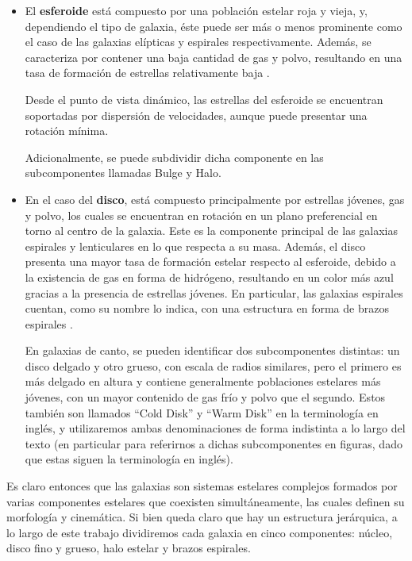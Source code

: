\begin{itemize}
    \item El \textbf{esferoide} está compuesto por una población estelar roja y vieja, y, dependiendo el tipo de galaxia, éste puede ser más o menos prominente como el caso de las galaxias elípticas y espirales respectivamente. Además, se caracteriza por contener una baja cantidad de gas y polvo, resultando en una tasa de formación de estrellas relativamente baja \citep{mo2010galaxy}.

    Desde el punto de vista dinámico, las estrellas del esferoide se encuentran soportadas por dispersión de velocidades, aunque puede presentar una rotación mínima.

    Adicionalmente, se puede subdividir dicha componente en las subcomponentes llamadas Bulge y Halo.

    \item En el caso del \textbf{disco}, está compuesto principalmente por estrellas jóvenes, gas y polvo, los cuales se encuentran en rotación en un plano preferencial en torno al centro de la galaxia. Este es la componente principal de las galaxias espirales y lenticulares en lo que respecta a su masa. Además, el disco presenta una mayor tasa de formación estelar respecto al esferoide, debido a la existencia de gas en forma de hidrógeno, resultando en un color más azul gracias a la presencia de estrellas jóvenes. En particular, las galaxias espirales cuentan, como su nombre lo indica, con una estructura en forma de brazos espirales \citep{mo2010galaxy}.

    En galaxias de canto, se pueden identificar dos subcomponentes distintas: un disco delgado y otro grueso, con escala de radios similares, pero el primero es más delgado en altura y contiene generalmente poblaciones estelares más jóvenes, con un mayor contenido de gas frío y polvo que el segundo. Estos también son llamados ``Cold Disk'' y ``Warm Disk'' en la terminología en inglés, y utilizaremos ambas denominaciones de forma indistinta a lo largo del texto (en particular para referirnos a dichas subcomponentes en figuras, dado que estas siguen la terminología en inglés).
    
\end{itemize}

Es claro entonces que las galaxias son sistemas estelares complejos formados por varias componentes estelares que coexisten simultáneamente, las cuales definen su morfología y cinemática. Si bien queda claro que hay un estructura jerárquica, a lo largo de este trabajo dividiremos cada galaxia en cinco componentes: núcleo, disco fino y grueso, halo estelar y brazos espirales.


